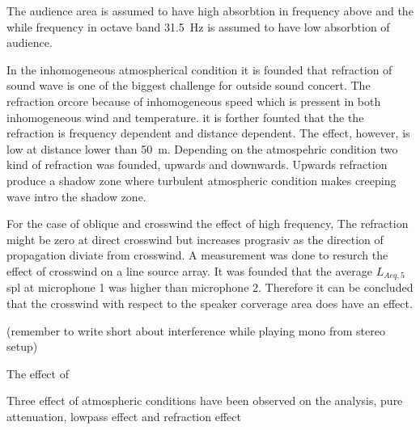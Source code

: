 The audience area is assumed to have high absorbtion in frequency above  and the while frequency in octave band \SI{31.5}{\hertz} is assumed to have low absorbtion of audience.  


In the inhomogeneous atmospherical condition it is founded that refraction of sound wave is one of the biggest challenge for outside sound concert. The refraction orcore because of inhomogeneous speed which is pressent in both inhomogeneous wind and temperature. it is forther founted that the the refraction is frequency dependent and distance dependent. The effect, however, is low at distance lower than \SI{50}{\meter}. Depending on the atmospehric condition two kind of refraction was founded, upwards and downwards. Upwards refraction produce a shadow zone where turbulent atmospheric condition makes creeping wave intro the shadow zone. 


For the case of oblique and crosswind the effect of high frequency, The refraction might be zero at direct crosswind but increases prograsiv as the direction of propagation diviate from crosswind. A measurement was done to resurch the effect of crosswind on a line source array. It was founded that the average $L_{Aeq,5}$ \gls{spl} at microphone 1 was  higher than microphone 2. Therefore it can be concluded that the crosswind with respect to the speaker corverage area does have an effect. 
 

  

(remember to write short about interference while playing mono from stereo setup)    


The effect of 

Three effect of atmospheric conditions have been observed on the analysis, pure attenuation, lowpass effect and refraction effect

